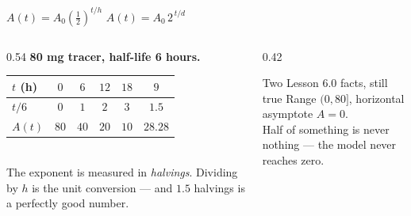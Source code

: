 \documentclass[aspectratio=169, 11pt]{beamer}
\begin{document}
\begin{frame}[t, plain]
  \begin{center}
    \large
    $A(t)=A_{0}\left(\frac12\right)^{t/h}$ \qquad\qquad $A(t)=A_{0}\,2^{\,t/d}$
  \end{center}
  \vspace{6pt}
  \begin{columns}[T]
    \begin{column}{0.54\textwidth}
      \footnotesize
      \textbf{80 mg tracer, half-life 6 hours.}
      \renewcommand{\arraystretch}{1.25}
      \begin{tabular}{|l|c|c|c|c|c|}
      \hline
      $t$ (h) & $0$ & $6$ & $12$ & $18$ & $9$ \\ \hline
      $t/6$ & $0$ & $1$ & $2$ & $3$ & $1.5$ \\ \hline
      $A(t)$ & $80$ & $40$ & $20$ & $10$ & $28.28$ \\ \hline
      \end{tabular}
      \\[6pt]
      {\scriptsize The exponent is measured in \emph{halvings}. Dividing by $h$ is the unit
      conversion --- and $1.5$ halvings is a perfectly good number.}
    \end{column}
    \begin{column}{0.42\textwidth}
      \begin{block}{Two Lesson 6.0 facts, still true}
        \footnotesize Range $(0,80]$, horizontal asymptote $A=0$. \\[3pt]
        Half of something is never nothing --- the model never reaches zero.
      \end{block}
    \end{column}
  \end{columns}
\end{frame}
\end{document}
